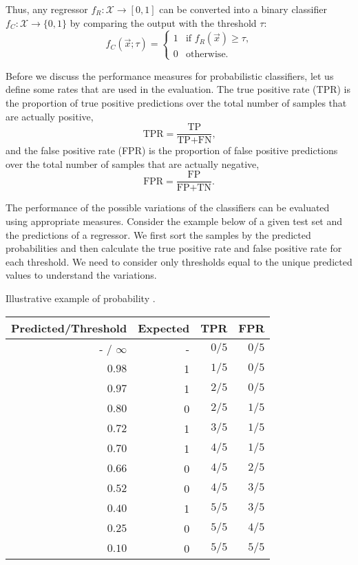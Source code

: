 Thus, any regressor $f_R : \mathcal{X} \rightarrow [0, 1]$ can be converted into a binary
classifier $f_C : \mathcal{X} \rightarrow \{0, 1\}$ by comparing the output with the
threshold $\tau$:
\begin{equation*}
  f_C(\vec{x}; \tau) = \begin{cases}
    1 & \text{if } f_R(\vec{x}) \geq \tau\text{,} \\
    0 & \text{otherwise}\text{.}
  \end{cases}
\end{equation*}

Before we discuss the performance measures for probabilistic classifiers, let us define
some rates that are used in the evaluation.  The true positive rate (TPR) is the proportion
of true positive predictions over the total number of samples that are actually positive,
\begin{equation*}
  \text{TPR} = \frac{\text{TP}}{\text{TP} + \text{FN}}\text{,}
\end{equation*}
and the false positive rate (FPR) is the proportion of false positive predictions over the
total number of samples that are actually negative,
\begin{equation*}
  \text{FPR} = \frac{\text{FP}}{\text{FP} + \text{TN}}\text{.}
\end{equation*}

The performance of the possible variations of the classifiers can be evaluated using
appropriate measures.  Consider the example below of a given test set and the predictions
of a regressor.  We first sort the samples by the predicted probabilities and then
calculate the true positive rate and false positive rate for each threshold.
We need to consider only thresholds equal to the unique predicted values to understand the
variations.

\begin{tablebox}[label=tab:prob-reg-example]{Illustrative example of probability .}
  \centering
  \begin{tabular}{rrrr}
    \toprule
    \textbf{Predicted/Threshold} & \textbf{Expected} & \textbf{TPR} & \textbf{FPR}  \\
    \midrule
    - / $\infty$ & - & $0/5$ & $0/5$ \\
    $0.98$       & 1 & $1/5$ & $0/5$ \\
    $0.97$       & 1 & $2/5$ & $0/5$ \\
    $0.80$       & 0 & $2/5$ & $1/5$ \\
    $0.72$       & 1 & $3/5$ & $1/5$ \\
    $0.70$       & 1 & $4/5$ & $1/5$ \\
    $0.66$       & 0 & $4/5$ & $2/5$ \\
    $0.52$       & 0 & $4/5$ & $3/5$ \\
    $0.40$       & 1 & $5/5$ & $3/5$ \\
    $0.25$       & 0 & $5/5$ & $4/5$ \\
    $0.10$       & 0 & $5/5$ & $5/5$ \\
    \bottomrule
  \end{tabular}
\end{tablebox}

